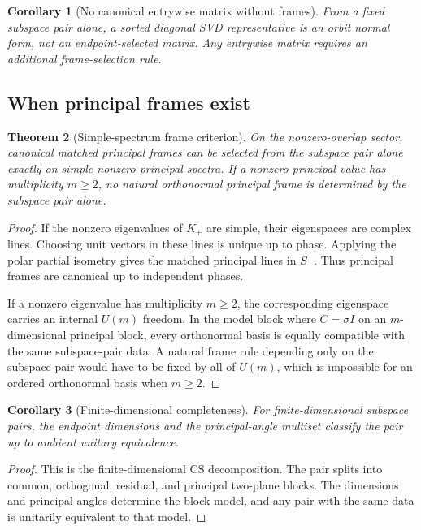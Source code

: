 \documentclass[11pt]{amsart}
\newtheorem{theorem}{Theorem}[section]
\newtheorem{corollary}[theorem]{Corollary}
\newcommand{\Id}{I}
\begin{document}
\begin{corollary}[No canonical entrywise matrix without frames]
From a fixed subspace pair alone, a sorted diagonal SVD representative is an
orbit normal form, not an endpoint-selected matrix. Any entrywise matrix
requires an additional frame-selection rule.
\end{corollary}

\subsection{When principal frames exist}

\begin{theorem}[Simple-spectrum frame criterion]
On the nonzero-overlap sector, canonical matched principal frames can be
selected from the subspace pair alone exactly on simple nonzero principal
spectra. If a nonzero principal value has multiplicity \(m\ge2\), no natural
orthonormal principal frame is determined by the subspace pair alone.
\end{theorem}

\begin{proof}
If the nonzero eigenvalues of \(K_+\) are simple, their eigenspaces are complex
lines. Choosing unit vectors in these lines is unique up to phase. Applying the
polar partial isometry gives the matched principal lines in \(S_-\). Thus
principal frames are canonical up to independent phases.

If a nonzero eigenvalue has multiplicity \(m\ge2\), the corresponding
eigenspace carries an internal \(U(m)\) freedom. In the model block where
\(C=\sigma\Id\) on an \(m\)-dimensional principal block, every orthonormal basis
is equally compatible with the same subspace-pair data. A natural frame rule
depending only on the subspace pair would have to be fixed by all of \(U(m)\),
which is impossible for an ordered orthonormal basis when \(m\ge2\).
\end{proof}

\begin{corollary}[Finite-dimensional completeness]
For finite-dimensional subspace pairs, the endpoint dimensions and the
principal-angle multiset classify the pair up to ambient unitary equivalence.
\end{corollary}

\begin{proof}
This is the finite-dimensional CS decomposition. The pair splits into common,
orthogonal, residual, and principal two-plane blocks. The dimensions and
principal angles determine the block model, and any pair with the same data is
unitarily equivalent to that model.
\end{proof}
\end{document}
